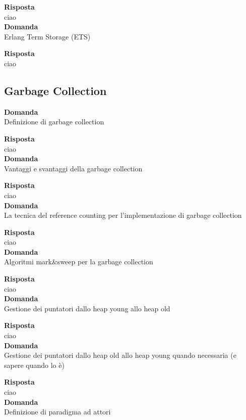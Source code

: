 \documentclass{article}
\begin{document}
\textbf{Risposta}\\
ciao
\vspace{14pt}\\
\textbf{Domanda}\\
Erlang Term Storage (ETS)

\textbf{Risposta}\\
ciao
\vspace{14pt}\\

\subsection*{Garbage Collection}
\textbf{Domanda}\\
Definizione di garbage collection

\textbf{Risposta}\\
ciao
\vspace{14pt}\\
\textbf{Domanda}\\
Vantaggi e svantaggi della garbage collection

\textbf{Risposta}\\
ciao
\vspace{14pt}\\
\textbf{Domanda}\\
La tecnica del reference counting per l'implementazione di garbage collection

\textbf{Risposta}\\
ciao
\vspace{14pt}\\
\textbf{Domanda}\\
Algoritmi mark\&sweep per la garbage collection

\textbf{Risposta}\\
ciao
\vspace{14pt}\\
\textbf{Domanda}\\
Gestione dei puntatori dallo heap young allo heap old

\textbf{Risposta}\\
ciao
\vspace{14pt}\\
\textbf{Domanda}\\
Gestione dei puntatori dallo heap old allo heap young quando necessaria (e sapere quando lo è)

\textbf{Risposta}\\
ciao
\vspace{14pt}\\
\textbf{Domanda}\\
Definizione di paradigma ad attori
\end{document}
